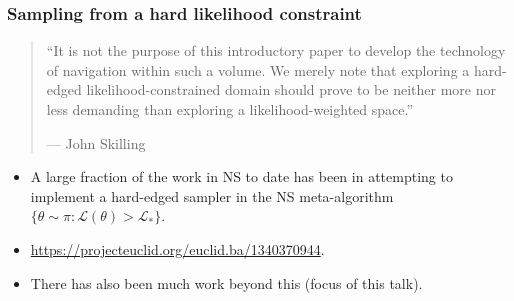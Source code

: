 \documentclass[aspectratio=169, handout]{beamer}
\begin{document}
\begin{frame}
  \frametitle{Sampling from a hard likelihood constraint} 
  
  \begin{quote}
    ``It is not the purpose of this introductory paper to develop the technology of navigation within such a volume. We merely note that exploring a hard-edged likelihood-constrained domain should prove to be neither more nor less demanding than exploring a likelihood-weighted space.''
    
   {\hfill --- John Skilling}
  \end{quote}

  \begin{itemize}
      
    \item A large fraction of the work in NS to date has been in attempting to implement a hard-edged sampler in the NS meta-algorithm $\{\theta\sim \pi : \mathcal{L}(\theta)>\mathcal{L}_* \}$.
    \item \url{https://projecteuclid.org/euclid.ba/1340370944}.
    \item There has also been much work beyond this (focus of this talk).
  \end{itemize}
 
\end{frame}
\end{document}
